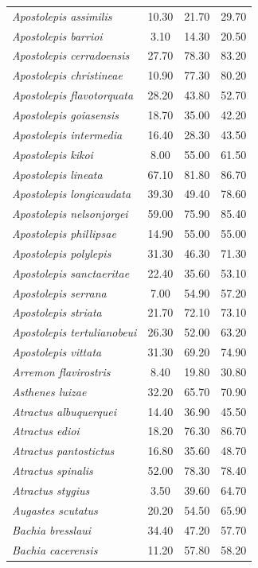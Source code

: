 \documentclass[12pt,openright,oneside,a4paper,english]{abntex2}
\begin{document}
\begin{longtable}{lccc}
	\textit{Apostolepis assimilis}&10.30 &21.70 &29.70 \\
	\textit{Apostolepis barrioi}&3.10 &14.30 &20.50 \\
	\textit{Apostolepis cerradoensis}&27.70 &78.30 &83.20 \\
	\textit{Apostolepis christineae}&10.90 &77.30 &80.20 \\
	\textit{Apostolepis flavotorquata}&28.20 &43.80 &52.70 \\
	\textit{Apostolepis goiasensis}&18.70 &35.00 &42.20 \\
	\textit{Apostolepis intermedia}&16.40 &28.30 &43.50 \\
	\textit{Apostolepis kikoi}&8.00 &55.00 &61.50 \\
	\textit{Apostolepis lineata}&67.10 &81.80 &86.70 \\
	\textit{Apostolepis longicaudata}&39.30 &49.40 &78.60 \\
	\textit{Apostolepis nelsonjorgei}&59.00 &75.90 &85.40 \\
	\textit{Apostolepis phillipsae}&14.90 &55.00 &55.00 \\
	\textit{Apostolepis polylepis}&31.30 &46.30 &71.30 \\
	\textit{Apostolepis sanctaeritae}&22.40 &35.60 &53.10 \\
	\textit{Apostolepis serrana}&7.00 &54.90 &57.20 \\
	\textit{Apostolepis striata}&21.70 &72.10 &73.10 \\
	\textit{Apostolepis tertulianobeui}&26.30 &52.00 &63.20 \\
	\textit{Apostolepis vittata}&31.30 &69.20 &74.90 \\
	\textit{Arremon flavirostris}&8.40 &19.80 &30.80 \\
	\textit{Asthenes luizae}&32.20 &65.70 &70.90 \\
	\textit{Atractus albuquerquei}&14.40 &36.90 &45.50 \\
	\textit{Atractus edioi}&18.20 &76.30 &86.70 \\
	\textit{Atractus pantostictus}&16.80 &35.60 &48.70 \\
	\textit{Atractus spinalis}&52.00 &78.30 &78.40 \\
	\textit{Atractus stygius}&3.50 &39.60 &64.70 \\
	\textit{Augastes scutatus}&20.20 &54.50 &65.90 \\
	\textit{Bachia bresslaui}&34.40 &47.20 &57.70 \\
	\textit{Bachia cacerensis}&11.20 &57.80 &58.20 \\

\end{longtable}
\end{document}
